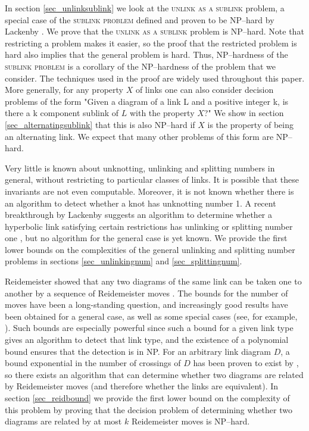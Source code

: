 \documentclass[12pt]{amsart}
\theoremstyle{definition}
\theoremstyle{remark}
\begin{document}
In section \ref{sec_unlinksublink} we look at the \textsc{unlink as a sublink} problem, a special case of the \textsc{sublink problem} defined and proven to be NP--hard by Lackenby \cite{Lackenby1}.  We prove that the \textsc{unlink as a sublink} problem is NP--hard.  Note that restricting a problem makes it easier, so the proof that the restricted problem is hard also implies that the general problem is hard.  Thus, NP--hardness of the \textsc{sublink problem} is a corollary of the NP--hardness of the problem that we consider. The techniques used in the proof are widely used throughout this paper.  More generally, for any property $X$ of links one can also consider decision problems of the form "Given a diagram of a link L and a positive integer k, is there a k component sublink of $L$ with the property $X$?"  We show in section \ref{sec_alternatingsublink} that this is also NP--hard if $X$ is the property of being an alternating link.  We expect that many other problems of this form are NP--hard.

Very little is known about unknotting, unlinking and splitting numbers in general, without restricting to particular classes of links. It is possible that these invariants are not even computable. Moreover, it is not known whether there is an algorithm to detect whether a knot has unknotting number 1. A recent breakthrough by Lackenby suggests an algorithm to determine whether a hyperbolic link satisfying certain restrictions has unlinking or splitting number one \cite{Lackenby5}, but no algorithm for the general case is yet known.  We provide the first lower bounds on the complexities of the general unlinking and splitting number problems in sections \ref{sec_unlinkingnum} and \ref{sec_splittingnum}.

Reidemeister showed that any two diagrams of the same link can be taken one to another by a sequence of Reidemeister moves \cite{Reidemeister1}. The bounds for the number of moves have been a long-standing question, and increasingly good results have been obtained for a general case, as well as some special cases (see, for example, \cite{HassLagariasPippenger1,Lackenby2,Lackenby4}). Such bounds are especially powerful since such a bound for a given link type gives an algorithm to detect that link type, and the existence of a polynomial bound ensures that the detection is in NP.  For an arbitrary link diagram $D$, a bound exponential in the number of crossings of $D$ has been proven to exist by \cite{CowardLackenby1}, so there exists an algorithm that can determine whether two diagrams are related by Reidemeister moves (and therefore whether the links are equivalent).  In section \ref{sec_reidbound} we provide the first lower bound on the complexity of this problem by proving that the decision problem of determining whether two diagrams are related by at most $k$ Reidemeister moves is NP--hard.
\end{document}
